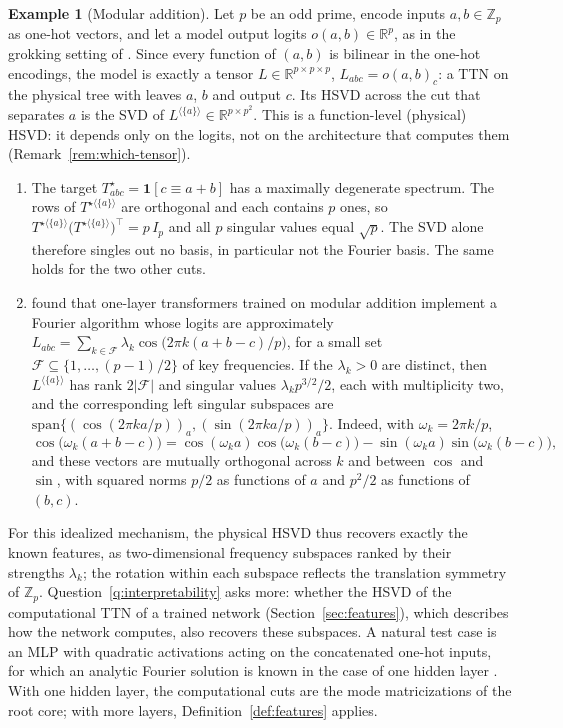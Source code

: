 \documentclass[11pt]{article}
\newcommand{\R}{\mathbb{R}}
\theoremstyle{definition}
\newtheorem{example}[theorem]{Example}
\numberwithin{equation}{section}
\begin{document}
\begin{example}[Modular addition]\label{ex:modular}
Let $p$ be an odd prime, encode inputs $a,b\in\mathbb Z_p$ as one-hot vectors, and let a model output logits $o(a,b)\in\R^p$, as in the grokking setting of \citet{power2022grokking}. Since every function of $(a,b)$ is bilinear in the one-hot encodings, the model is exactly a tensor $L\in\R^{p\times p\times p}$, $L_{abc}=o(a,b)_c$: a TTN on the physical tree with leaves $a$, $b$ and output $c$. Its HSVD across the cut that separates $a$ is the SVD of $L^{\langle\{a\}\rangle}\in\R^{p\times p^2}$. This is a function-level (physical) HSVD: it depends only on the logits, not on the architecture that computes them (Remark~\ref{rem:which-tensor}).
\begin{enumerate}[label=(\roman*),nosep]
\item The target $T^\star_{abc}=\mathbf 1[c\equiv a+b]$ has a maximally degenerate spectrum. The rows of $T^{\star\langle\{a\}\rangle}$ are orthogonal and each contains $p$ ones, so $T^{\star\langle\{a\}\rangle}\big(T^{\star\langle\{a\}\rangle}\big)^\top=p\,I_p$ and all $p$ singular values equal $\sqrt p$. The SVD alone therefore singles out no basis, in particular not the Fourier basis. The same holds for the two other cuts.
\item \citet{nanda2023progress} found that one-layer transformers trained on modular addition implement a Fourier algorithm whose logits are approximately $L_{abc}=\sum_{k\in\mathcal F}\lambda_k\cos\big(2\pi k(a+b-c)/p\big)$, for a small set $\mathcal F\subseteq\{1,\dots,(p-1)/2\}$ of key frequencies. If the $\lambda_k>0$ are distinct, then $L^{\langle\{a\}\rangle}$ has rank $2|\mathcal F|$ and singular values $\lambda_kp^{3/2}/2$, each with multiplicity two, and the corresponding left singular subspaces are $\mathrm{span}\{(\cos(2\pi ka/p))_{a},(\sin(2\pi ka/p))_{a}\}$. Indeed, with $\omega_k=2\pi k/p$,
\[
\cos\big(\omega_k(a+b-c)\big)=\cos(\omega_ka)\cos\big(\omega_k(b-c)\big)-\sin(\omega_ka)\sin\big(\omega_k(b-c)\big),
\]
and these vectors are mutually orthogonal across $k$ and between $\cos$ and $\sin$, with squared norms $p/2$ as functions of $a$ and $p^2/2$ as functions of $(b,c)$.
\end{enumerate}
For this idealized mechanism, the physical HSVD thus recovers exactly the known features, as two-dimensional frequency subspaces ranked by their strengths $\lambda_k$; the rotation within each subspace reflects the translation symmetry of $\mathbb Z_p$. Question~\ref{q:interpretability} asks more: whether the HSVD of the computational TTN of a trained network (Section~\ref{sec:features}), which describes how the network computes, also recovers these subspaces. A natural test case is an MLP with quadratic activations acting on the concatenated one-hot inputs, for which an analytic Fourier solution is known in the case of one hidden layer \citep{gromov2023grokking}. With one hidden layer, the computational cuts are the mode matricizations of the root core; with more layers, Definition~\ref{def:features} applies.
\end{example}
\end{document}
